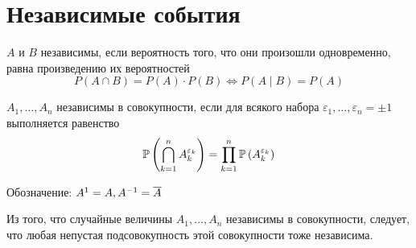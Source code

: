 \section{Независимые события}
\begin{definition} $A$ и $B$ независимы, если вероятность того,
    что они произошли одновременно, равна произведению их вероятностей
    $$P\left(A\cap B\right)
    =P\left(A\right)\cdot P\left(B\right)\Leftrightarrow P\left(A\mid B\right)
    =P\left(A\right)$$
\end{definition}
\begin{definition} $A_1, \dots, A_n$ независимы в совокупности,
    если для всякого набора $\varepsilon_1, \dots, \varepsilon_n=\pm 1$
    выполняется равенство
    $$\mathbb{P}\left( \bigcap_{k=1}^n A_{k}^{\varepsilon_k} \right)
    =\prod_{k=1}^n \mathbb{P}\left( A_{k}^{\varepsilon_k} \right)$$

    Обозначение: $A^1=A, A^{-1}=\overline{A}$
\end{definition}
\begin{affirmation}
    Из того, что случайные величины $A_1, \dots, A_n$ независимы в совокупности,
    следует, что любая непустая подсовокупность этой совокупности
    тоже независима.
\end{affirmation}
